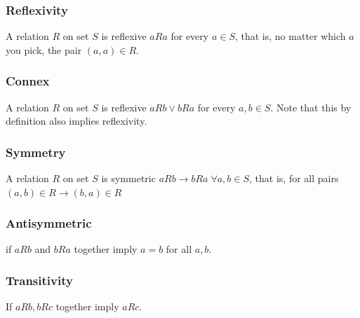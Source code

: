 \documentclass[a4paper]{article}
\theoremstyle{plain}
\theoremstyle{definition}
\newtheorem{defn}{Definition}[section]
\theoremstyle{remark}
\begin{document}
\subsubsection{Reflexivity}
\begin{tcolorbox}[colback=black!3!white,colframe=black!60!white,title=\begin{defn}Reflexivity \label{Reflexivity}\end{defn}]

A relation $R$ on set $S$ is reflexive $aRa$ for every $a \in S$, that is, no matter which $a$ you pick, the pair $(a,a) \in R$. 
\end{tcolorbox}
\subsubsection{Connex}
\begin{tcolorbox}[colback=black!3!white,colframe=black!60!white,title=\begin{defn}Connex \label{Connex}\end{defn}]
A relation $R$ on set $S$ is reflexive $aRb \lor bRa$ for every $a,b \in S$. Note that this by definition also implies reflexivity.
\end{tcolorbox}
\subsubsection{Symmetry}
\begin{tcolorbox}[colback=black!3!white,colframe=black!60!white,title=\begin{defn}Symmetry \label{Symmetry}\end{defn}]

A relation $R$ on set $S$ is symmetric $aRb \to bRa \; \forall a,b \in S$, that is, for all pairs $(a,b) \in R \to (b,a) \in R$
\end{tcolorbox}
\subsubsection{Antisymmetric}
\begin{tcolorbox}[colback=black!3!white,colframe=black!60!white,title=\begin{defn}Antisymmetric \label{Antisymmetric}\end{defn}]
if $aRb$ and $bRa$ together imply $a=b$ for all $a,b$. 
\end{tcolorbox}
\subsubsection{Transitivity}
\begin{tcolorbox}[colback=black!3!white,colframe=black!60!white,title=\begin{defn}Transitivity \label{Transitivity}\end{defn}]
If $aRb,bRc$ together imply $aRc$.
\end{tcolorbox}
\end{document}
